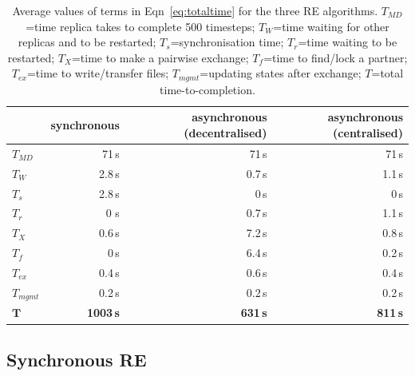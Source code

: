 \documentclass{rspublic}
\newcommand{\alnote}[1]{ {\textcolor{blue} { ***andre: #1 }}}
\newcommand{\athotanote}[1]{ {\textcolor{green} { ***athota: #1 }}}
\newcommand{\alnote}[1]{}
\newcommand{\athotanote}[1]{}
\begin{document}
\begin{table}
    \centering
	\begin{tabular}{|l|r|r|r|}
	\hline
	                        &\textbf{synchronous}  &\textbf{asynchronous (decentralised)} 
	                        &\textbf{asynchronous (centralised)}\\
	\hline
	\hline
	$T_{MD}$       &71\,s &71\,s &71\,s\\
	\hline
	\hline
	$T_{W}$        &2.8\,s &0.7\,s &1.1\,s\\
    \hline
    \hspace{2mm}$T_{s}$ &2.8\,s &0\,s &0\,s\\ 
    \hline
    \hspace{2mm}$T_{r}$ &0 s&0.7\,s &1.1\,s\\
	\hline\hline
	$T_{X}$        &0.6\,s &7.2\,s &0.8\,s\\
	\hline
	\hspace{2mm}$T_{f}$        &0\,s   &6.4\,s &0.2\,s\\
	\hline
	\hspace{2mm}$T_{ex}$       &0.4\,s &0.6\,s &0.4\,s\\
	\hline
    \hspace{2mm}$T_{mgmt}$    &0.2\,s &0.2\,s  &0.2\,s\\
	\hline
	\hline
	$\mathbf{T}$        &\textbf{1003\,s} &\textbf{631\,s}    &\textbf{811\,s}\\
	\hline
    \end{tabular}
    \caption{Average values of terms in Eqn~\ref{eq:totaltime} for the three RE algorithms. $T_{MD}$=time replica takes to complete 500 timesteps; $T_W$=time waiting for other replicas and to be restarted; $T_s$=synchronisation time; $T_r$=time waiting to be restarted; $T_X$=time to make a pairwise exchange; $T_f$=time to find/lock a partner; $T_{ex}$=time to write/transfer files; $T_{mgmt}$=updating states after exchange; $T$=total time-to-completion.}
	\label{table:repex_perf}
\end{table}

\subsection{Synchronous RE}
\label{sec:impl_sync_re}
\end{document}
